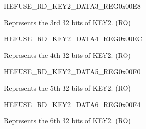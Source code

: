 \begin{register}{H}{EFUSE\_RD\_KEY2\_DATA3\_REG}{0x00E8}\label{regdesc:EFUSERDKEY2DATA3REG}
%
\regnewline%
\begin{regdesc}\begin{reglist}
\label{fielddesc:EFUSEKEY2DATA3}\item [EFUSE\_KEY2\_DATA3] Represents the 3rd 32 bits of KEY2. (RO)
\end{reglist}\end{regdesc}
\end{register}


\begin{register}{H}{EFUSE\_RD\_KEY2\_DATA4\_REG}{0x00EC}\label{regdesc:EFUSERDKEY2DATA4REG}
%
\regnewline%
\begin{regdesc}\begin{reglist}
\label{fielddesc:EFUSEKEY2DATA4}\item [EFUSE\_KEY2\_DATA4] Represents the 4th 32 bits of KEY2. (RO)
\end{reglist}\end{regdesc}
\end{register}


\begin{register}{H}{EFUSE\_RD\_KEY2\_DATA5\_REG}{0x00F0}\label{regdesc:EFUSERDKEY2DATA5REG}
%
\regnewline%
\begin{regdesc}\begin{reglist}
\label{fielddesc:EFUSEKEY2DATA5}\item [EFUSE\_KEY2\_DATA5] Represents the 5th 32 bits of KEY2. (RO)
\end{reglist}\end{regdesc}
\end{register}


\begin{register}{H}{EFUSE\_RD\_KEY2\_DATA6\_REG}{0x00F4}\label{regdesc:EFUSERDKEY2DATA6REG}
%
\regnewline%
\begin{regdesc}\begin{reglist}
\label{fielddesc:EFUSEKEY2DATA6}\item [EFUSE\_KEY2\_DATA6] Represents the 6th 32 bits of KEY2. (RO)
\end{reglist}\end{regdesc}
\end{register}


